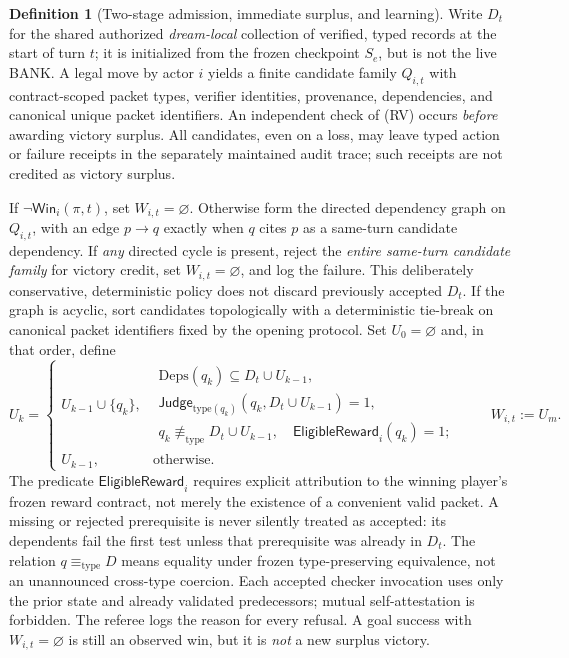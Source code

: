 \documentclass[11pt,letterpaper]{article}
\theoremstyle{definition}
\newtheorem{definition}{Definition}[section]
\theoremstyle{plain}
\theoremstyle{definition}
\begin{document}
\begin{definition}[Two-stage admission, immediate surplus, and learning]
Write $D_t$ for the shared authorized \emph{dream-local} collection of verified, typed records at the start of turn $t$; it is initialized from the frozen checkpoint $S_e$, but is not the live BANK. A legal move by actor $i$ yields a finite candidate family $Q_{i,t}$ with contract-scoped packet types, verifier identities, provenance, dependencies, and canonical unique packet identifiers. An independent check of (RV) occurs \emph{before} awarding victory surplus. All candidates, even on a loss, may leave typed action or failure receipts in the separately maintained audit trace; such receipts are not credited as victory surplus.

If $\neg\mathsf{Win}_i(\pi,t)$, set $W_{i,t}=\varnothing$. Otherwise form the directed dependency graph on $Q_{i,t}$, with an edge $p\to q$ exactly when $q$ cites $p$ as a same-turn candidate dependency. If \emph{any} directed cycle is present, reject the \emph{entire same-turn candidate family} for victory credit, set $W_{i,t}=\varnothing$, and log the failure. This deliberately conservative, deterministic policy does not discard previously accepted $D_t$. If the graph is acyclic, sort candidates topologically with a deterministic tie-break on canonical packet identifiers fixed by the opening protocol. Set $U_0=\varnothing$ and, in that order, define
\[
 U_k=\begin{cases}
 U_{k-1}\cup\{q_k\},&\begin{gathered}
 \mathrm{Deps}(q_k)\subseteq D_t\cup U_{k-1},\\[-2pt]
 \mathsf{Judge}_{\mathrm{type}(q_k)}(q_k,D_t\cup U_{k-1})=1,\\[-2pt]
 q_k\not\equiv_{\mathrm{type}}D_t\cup U_{k-1},\quad \mathsf{EligibleReward}_i(q_k)=1;
 \end{gathered}\\
 U_{k-1},&\text{otherwise.}
 \end{cases}
 \qquad W_{i,t}:=U_m.\tag{SV}
\]
The predicate $\mathsf{EligibleReward}_i$ requires explicit attribution to the winning player's frozen reward contract, not merely the existence of a convenient valid packet. A missing or rejected prerequisite is never silently treated as accepted: its dependents fail the first test unless that prerequisite was already in $D_t$. The relation $q\equiv_{\mathrm{type}}D$ means equality under frozen type-preserving equivalence, not an unannounced cross-type coercion. Each accepted checker invocation uses only the prior state and already validated predecessors; mutual self-attestation is forbidden. The referee logs the reason for every refusal. A goal success with $W_{i,t}=\varnothing$ is still an observed win, but it is \emph{not} a new surplus victory.


\end{definition}
\end{document}
